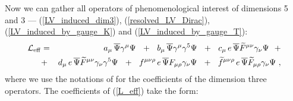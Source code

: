 \documentclass[a4paper,12pt]{article}
\begin{document}
	Now we can gather all operators of phenomenological
	interest of dimensions 5 and 3 --- 
	(\ref{LV_induced_dim3}), (\ref{resolved_LV_Dirac}),
	(\ref{LV_induced_by_gauge_K}) and
	(\ref{LV_induced_by_gauge_T}):
\begin{eqnarray}
\label{L_eff}
	  \mathcal{L}_{\rm eff}
        & = &
        a_\mu\, \overline{\Psi} \gamma^\mu \Psi
	~~+~~
	b_\mu\, \overline{\Psi} \gamma^\mu \gamma^5 \Psi
	~~+~~
	c_\mu\, e\, \overline{\Psi} \widetilde{F}^{\mu\nu}
	                    \gamma_\nu \Psi
        ~~+\\
\nonumber
	& + &
	d_\mu\, e\, \overline{\Psi} \widetilde{F}^{\mu\nu}
	                    \gamma_\nu \gamma^5 \Psi
        ~~+~~
        f^{\mu\nu\rho}\, 
	     e\, \overline{\Psi} F_{\mu\rho} 
                 \gamma_\nu \Psi
	~~+~~
	\widetilde{f}^{\mu\nu\rho}\,
	     e\, \overline{\Psi} \widetilde{F}_{\mu\rho} 
                 \gamma_\nu \Psi
	~,
\end{eqnarray}
	where we use the notations of 
\cite{Colladay:1998fq}
	for the coefficients of the 
	dimension three operators.
	The coefficients of (\ref{L_eff}) take the form:
\end{document}
